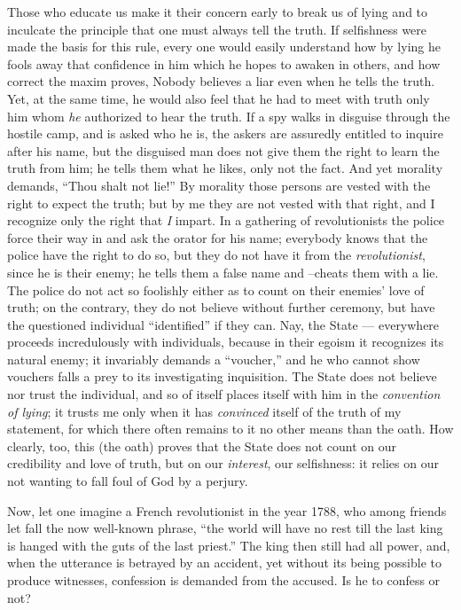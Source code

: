 Those who educate us make it their concern early to break us of lying and to 
inculcate the principle that one must always tell the truth. If selfishness 
were made the basis for this rule, every one would easily understand how by 
lying he fools away that confidence in him which he hopes to awaken in others, 
and how correct the maxim proves, Nobody believes a liar even when he tells 
the truth. Yet, at the same time, he would also feel that he had to meet with 
truth only him whom \textit{he} authorized to hear the truth. If a spy walks 
in disguise through the hostile camp, and is asked who he is, the askers are 
assuredly entitled to inquire after his name, but the disguised man does not 
give them the right to learn the truth from him; he tells them what he likes, 
only not the fact. And yet morality demands, ``Thou shalt not lie!'' By 
morality those persons are vested with the right to expect the truth; but by 
me they are not vested with that right, and I recognize only the right that 
\textit{I} impart. In a gathering of revolutionists the police force their way 
in and ask the orator for his name; everybody knows that the police have the 
right to do so, but they do not have it from the \textit{revolutionist}, since 
he is their enemy; he tells them a false name and --cheats them with a lie. 
The police do not act so foolishly either as to count on their enemies' love 
of truth; on the contrary, they do not believe without further ceremony, but 
have the questioned individual ``identified'' if they can. Nay, the State --- everywhere proceeds incredulously with individuals, because in their egoism it 
recognizes its natural enemy; it invariably demands a ``voucher,'' and he 
who cannot show vouchers falls a prey to its investigating inquisition. The 
State does not believe nor trust the individual, and so of itself places 
itself with him in the \textit{convention of lying}; it trusts me only when it 
has \textit{convinced} itself of the truth of my statement, for which there 
often remains to it no other means than the oath. How clearly, too, this (the 
oath) proves that the State does not count on our credibility and love of 
truth, but on our \textit{interest}, our selfishness: it relies on our not 
wanting to fall foul of God by a perjury.

Now, let one imagine a French revolutionist in the year 1788, who among 
friends let fall the now well-known phrase, ``the world will have no rest 
till the last king is hanged with the guts of the last priest.'' The king 
then still had all power, and, when the utterance is betrayed by an accident, 
yet without its being possible to produce witnesses, confession is demanded 
from the accused. Is he to confess or not?


